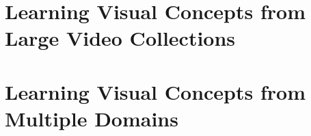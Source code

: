 \section{Learning Visual Concepts from Large Video Collections}








\section{Learning Visual Concepts from Multiple Domains}
